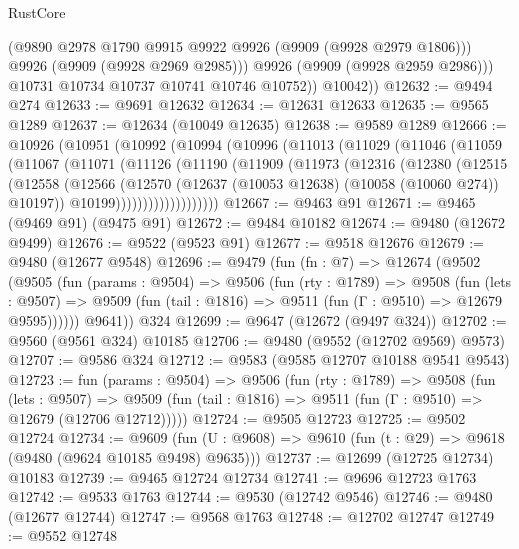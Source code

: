 \begin{lexlean}{RustCore}
\begin{coremodule}
                (@9890 @2978 @1790 @9915 @9922 @9926 (@9909 (@9928 @2979 @1806)))
                @9926
                (@9909 (@9928 @2969 @2985)))
              @9926
              (@9909 (@9928 @2959 @2986)))
            @10731
            @10734
            @10737
            @10741
            @10746
            @10752))
        @10042))
@12632 := @9494 @274
@12633 := @9691 @12632
@12634 := @12631 @12633
@12635 := @9565 @1289
@12637 := @12634 (@10049 @12635)
@12638 := @9589 @1289
@12666 := @10926
    (@10951
      (@10992
        (@10994
          (@10996
            (@11013
              (@11029
                (@11046
                  (@11059
                    (@11067
                      (@11071
                        (@11126
                          (@11190
                            (@11909
                              (@11973
                                (@12316
                                  (@12380
                                    (@12515
                                      (@12558
                                        (@12566
                                          (@12570
                                            (@12637 (@10053 @12638) (@10058 (@10060 @274)) @10197))
                                          @10199)))))))))))))))))))
@12667 := @9463 @91
@12671 := @9465 (@9469 @91) (@9475 @91)
@12672 := @9484 @10182
@12674 := @9480 (@12672 @9499)
@12676 := @9522 (@9523 @91)
@12677 := @9518 @12676
@12679 := @9480 (@12677 @9548)
@12696 := @9479
    (fun (fn : @7) =>
    @12674
      (@9502
        (@9505
          (fun (params : @9504) =>
          @9506
            (fun (rty : @1789) =>
            @9508
              (fun (lets : @9507) =>
              @9509 (fun (tail : @1816) => @9511 (fun (Γ : @9510) => @12679 @9595))))))
        @9641))
    @324
@12699 := @9647 (@12672 (@9497 @324))
@12702 := @9560 (@9561 @324) @10185
@12706 := @9480 (@9552 (@12702 @9569) @9573)
@12707 := @9586 @324
@12712 := @9583 (@9585 @12707 @10188 @9541 @9543)
@12723 := fun (params : @9504) =>
  @9506
    (fun (rty : @1789) =>
    @9508
      (fun (lets : @9507) =>
      @9509 (fun (tail : @1816) => @9511 (fun (Γ : @9510) => @12679 (@12706 @12712)))))
@12724 := @9505 @12723
@12725 := @9502 @12724
@12734 := @9609
    (fun (U : @9608) => @9610 (fun (t : @29) => @9618 (@9480 (@9624 @10185 @9498) @9635)))
@12737 := @12699 (@12725 @12734) @10183
@12739 := @9465 @12724 @12734
@12741 := @9696 @12723 @1763
@12742 := @9533 @1763
@12744 := @9530 (@12742 @9546)
@12746 := @9480 (@12677 @12744)
@12747 := @9568 @1763
@12748 := @12702 @12747
@12749 := @9552 @12748

\end{coremodule}
\end{lexlean}
